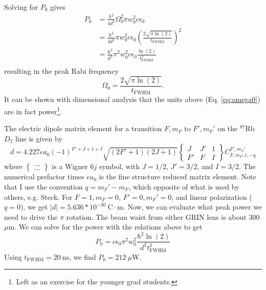 Solving for $P_0$ gives
\begin{equation}\label{eq:p0}
\begin{split}
P_0 & = \frac{\hbar^2}{4d^2}\Omega_0^2\pi w_0^2 c \epsilon_0 \\
 & = \frac{\hbar^2}{4d^2} \pi w_0^2 c \epsilon_0 \left(\frac{2\sqrt{\pi \ln(2)}}{t_{\textrm{FWHM}}}\right)^2 \\
 & = \frac{\hbar^2}{d^2} \pi^2 w_0^2 c \epsilon_0\frac{\ln(2)}{t_{\textrm{FWHM}}^2} \\
\end{split}
\end{equation}
resulting in the peak Rabi frequency
\begin{equation}\label{eq:omega0}
    \Omega_0=\frac{2\sqrt{\pi \ln(2)}}{t_{\textrm{FWHM}}}.
\end{equation}
It can be shown with dimensional analysis that the units above (Eq. \ref{eq:omega0}) are in fact power\footnote{Left as an exercise for the younger grad students.}.

The electric dipole matrix element for a transition $F,m_F$ to $F',m_F'$ on the $^{87}\textrm {Rb}$  $D_2$ line is given by
\begin{equation}d=4.227 e a_0 (-1)^{F'+J+1+I} \sqrt{(2 F'+1)(2 J+1)}\left\{\begin{array}{ccc}
J & J' & 1 \\
F' & F & I
\end{array}\right\}C_{F,m_F;1,-q}^{F',m_F'}
\end{equation}
where $\left\{ \begin{array}{c} \dots \\ \dots \end{array} \right\}$ is a Wigner $6j$ symbol, with $J=1/2$, $J'=3/2$, and $I=3/2$. The numerical prefactor times $e a_0$ is the fine structure reduced matrix element. Note that I use the convention $q = m_F' - m_F$, which opposite of what is used by others, e.g. Steck.
For $F=1, m_F=0$,  $F'=0, m_F'=0$, and linear polarization ($q=0$), we get
$|d|=5.636*10^{-30} ~\textrm{C}\cdot\textrm{m}$.
Now, we can evaluate what peak power we need to drive the $\pi$ rotation. The beam waist from either GRIN lens is about 300 $\mu \textrm{m}$. We can solve for the power with the relations above to get
\begin{equation}
    P_0 = c \epsilon_0 \pi^2 w_0^2 \frac{\hbar^2 \ln(2)}{d^2 t_{\textrm{FWHM}}^2}
\end{equation}
Using $t_{\textrm{FWHM}}=20~ \textrm{ns}$, we find $P_0 = 212~\mu \textrm{W}$.

